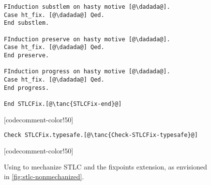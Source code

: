 \begin{figure}
\begin{minipage}{\textwidth}
\begin{multicols}{2}
\begin{lstlisting}[firstnumber=77]
FInduction substlem on hasty motive [@\dadada@].
Case ht_fix. [@\dadada@] Qed.
End substlem.

FInduction preserve on hasty motive [@\dadada@].
Case ht_fix. [@\dadada@] Qed.
End preserve.

FInduction progress on hasty motive [@\dadada@].
Case ht_fix. [@\dadada@] Qed.
End progress.

End STLCFix.[@\tanc{STLCFix-end}@]
\end{lstlisting}

[codecomment-color!50]

\vspace{-8pt}


\begin{lstlisting}[firstnumber=111]
Check STLCFix.typesafe.[@\tanc{Check-STLCFix-typesafe}@]
\end{lstlisting}

[codecomment-color!50]

\end{multicols}
\end{minipage}
\caption{Using \Lang to mechanize STLC and the fixpoints extension,
as envisioned in \cref{fig:stlc-nonmechanized}.}
\label{fig:stlc-mechanized}
\end{figure}




\ifShowOldWriting

